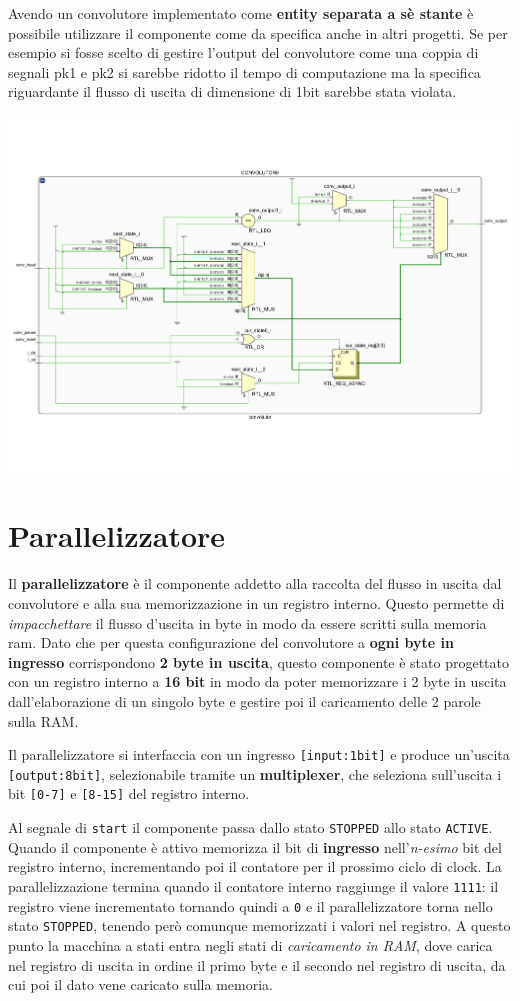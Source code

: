 \documentclass[a4paper]{report}
\begin{document}
Avendo un convolutore implementato come \textbf{entity separata a sè stante} è possibile utilizzare il componente come da specifica anche in altri progetti. Se per esempio si fosse scelto di gestire l'output del convolutore come una coppia di segnali pk1 e pk2 si sarebbe ridotto il tempo di computazione ma la specifica riguardante il flusso di uscita di dimensione di 1bit sarebbe stata violata.

\includegraphics[scale = 0.45]{schematics/convolutor.pdf}

\section{Parallelizzatore}
Il \textbf{parallelizzatore} è il componente addetto alla raccolta del flusso in uscita dal convolutore e alla sua memorizzazione in un registro interno. Questo permette di \textit{impacchettare} il flusso d'uscita in byte in modo da essere scritti sulla memoria ram. 
Dato che per questa configurazione del convolutore a \textbf{ogni byte in ingresso} corrispondono \textbf{2 byte in uscita}, questo componente è stato progettato con un registro interno a \textbf{16 bit} in modo da poter memorizzare i 2 byte in uscita dall'elaborazione di un singolo byte e gestire poi il caricamento delle 2 parole sulla RAM. 

Il parallelizzatore si interfaccia con un ingresso \texttt{[input:1bit]} e produce un'uscita \texttt{[output:8bit]}, selezionabile tramite un \textbf{multiplexer}, che seleziona sull'uscita i bit \texttt{[0-7]} e \texttt{[8-15]} del registro interno.

Al segnale di \texttt{start} il componente passa dallo stato \texttt{STOPPED} allo stato \texttt{ACTIVE}. Quando il componente è attivo memorizza il bit di \textbf{ingresso} nell'\textit{n-esimo} bit del registro interno, incrementando poi il contatore per il prossimo ciclo di clock. La parallelizzazione termina quando il contatore interno raggiunge il valore \texttt{1111}: il registro viene incrementato tornando quindi a \texttt{0} e il parallelizzatore torna nello stato \texttt{STOPPED}, tenendo però comunque memorizzati i valori nel registro. A questo punto la macchina a stati entra negli stati di \textit{caricamento in RAM}, dove carica nel registro di uscita in ordine il primo byte e il secondo nel registro di uscita, da cui poi il dato vene caricato sulla memoria.
\end{document}
